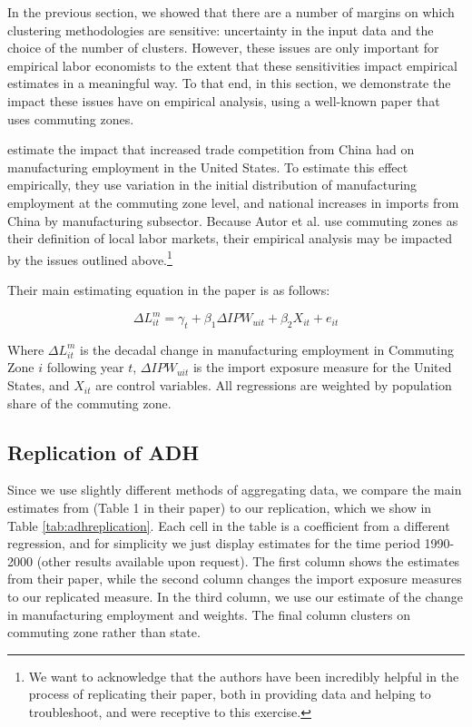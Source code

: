 In the previous section, we showed that there are a number of margins on which clustering methodologies are sensitive:  uncertainty in the input data and the choice of the number of clusters. However, these issues are only important for empirical labor economists to the extent that these
sensitivities impact empirical estimates in a meaningful way. To that end, in this section, we demonstrate the impact these issues have on empirical analysis, using a well-known paper that uses commuting zones.

\citet{ADH2013} estimate the impact that increased trade competition from China had on manufacturing
employment in the United States. To estimate this effect empirically, they use variation in the initial
distribution of manufacturing employment at the commuting zone level, and national increases in imports
from China by manufacturing subsector. Because Autor et al. use commuting zones as their definition of
local labor markets, their empirical analysis may be impacted by the issues outlined above.\footnote{We
want to acknowledge that the authors have been incredibly helpful in the process of replicating their
paper, both in providing data and helping to troubleshoot, and were receptive to this exercise.}

Their main estimating equation in the paper is as follows:

\begin{equation}\label{eqn:adh}
\Delta L_{it}^m = \gamma_t + \beta_1 \Delta IPW_{uit} + \beta_2 X_{it} + e_{it}
\end{equation}

Where $\Delta L_{it}^m$ is the decadal change in manufacturing employment in Commuting Zone $i$ following year $t$, $\Delta IPW_{uit}$ is the import exposure measure for the United States, and $X_{it}$ are control variables. All regressions are weighted by population share of the commuting zone.

\subsection{Replication of ADH}
\FloatBarrier
Since we use slightly different methods of aggregating data, we compare the main estimates from \citet{ADH2013} (Table 1 in their paper) to our replication, which we show in Table \ref{tab:adhreplication}. Each cell in the table is a coefficient from a different regression, and for simplicity we just display estimates for the time period 1990-2000 (other results available upon request). The first column shows the estimates from their paper, while the second column changes the import exposure measures to our replicated measure. In the third column, we use our estimate of the change in manufacturing employment and weights. The final column clusters on commuting zone rather than state.

